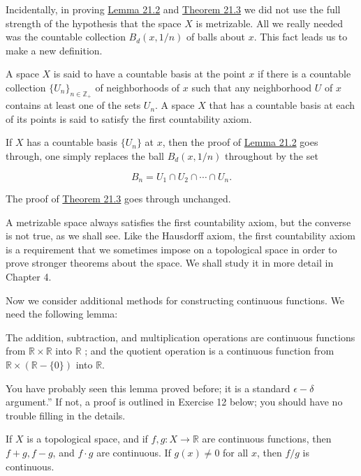 \begin{centeredblock}
 Incidentally, in proving \hyperref[lem:21.2]{Lemma 21.2} and \hyperref[thm:21.3]{Theorem 21.3} we did not use the full strength of the hypothesis that the space \(X\) is metrizable. All we really needed was the countable collection \(B_{d}( {x,1/n})\) of balls about \(x\). This fact leads us to make a new definition.

 A space \(X\) is said to have a countable basis at the point \(x\) if there is a countable collection \({\{ U_{n}\} }_{n \in {\mathbb{Z}}_{ + }}\) of neighborhoods of \(x\) such that any neighborhood \(U\) of \(x\) contains at least one of the sets \(U_{n}\). A space \(X\) that has a countable basis at each of its points is said to satisfy the first countability axiom.

 If \(X\) has a countable basis \(\{ U_{n}\}\) at \(x\), then the proof of \hyperref[lem:21.2]{Lemma 21.2} goes through, one simply replaces the ball \(B_{d}( {x,1/n})\) throughout by the set

 \[
 B_{n} = U_{1} \cap {U}_{2} \cap \cdots \cap {U}_{n}.
 \]

 The proof of \hyperref[thm:21.3]{Theorem 21.3} goes through unchanged.

 A metrizable space always satisfies the first countability axiom, but the converse is not true, as we shall see. Like the Hausdorff axiom, the first countability axiom is a requirement that we sometimes impose on a topological space in order to prove stronger theorems about the space. We shall study it in more detail in Chapter 4.
\end{centeredblock}

Now we consider additional methods for constructing continuous functions. We need the following lemma:

\begin{lemma}
\label{lem:\thetheorem}
 The addition, subtraction, and multiplication operations are continuous functions from \(\mathbb{R} \times \mathbb{R}\) into \(\mathbb{R}\) ; and the quotient operation is a continuous function from \(\mathbb{R} \times ( {\mathbb{R}-\{ 0\} })\) into \(\mathbb{R}\).
\end{lemma}

You have probably seen this lemma proved before; it is a standard \(\epsilon - \delta\) argument.'' If not, a proof is outlined in Exercise 12 below; you should have no trouble filling in the details.

\begin{theorem}
\label{thm:\thetheorem}
 If \(X\) is a topological space, and if \(f,g : X \rightarrow \mathbb{R}\) are continuous functions, then \(f + g,f - g\), and \(f \cdot g\) are continuous. If \(g(x) \neq 0\) for all \(x\), then \(f/g\) is continuous.
\end{theorem}


